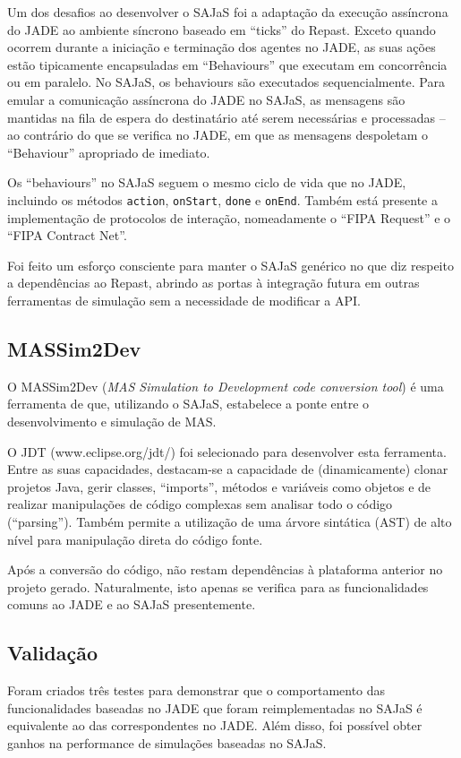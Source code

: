 \documentclass[9pt,a4paper]{extarticle}
\begin{document}
\begin{multicols}{2}
Um dos desafios ao desenvolver o SAJaS foi a adaptação da execução assíncrona do JADE ao ambiente síncrono baseado em ``ticks'' do Repast. Exceto quando ocorrem durante a iniciação e terminação dos agentes no JADE, as suas ações estão tipicamente encapsuladas em ``Behaviours'' que executam em concorrência ou em paralelo. No SAJaS, os behaviours são executados sequencialmente. Para emular a comunicação assíncrona do JADE no SAJaS, as mensagens são mantidas na fila de espera do destinatário até serem necessárias e processadas -- ao contrário do que se verifica no JADE, em que as mensagens despoletam o ``Behaviour'' apropriado de imediato.

Os ``behaviours'' no SAJaS seguem o mesmo ciclo de vida que no JADE, incluindo os métodos \texttt{action}, \texttt{onStart}, \texttt{done} e \texttt{onEnd}. Também está presente a implementação de protocolos de interação, nomeadamente o ``FIPA Request'' e o ``FIPA Contract Net''.

Foi feito um esforço consciente para manter o SAJaS genérico no que diz respeito a dependências ao Repast, abrindo as portas à integração futura em outras ferramentas de simulação sem a necessidade de modificar a API.

\subsection{MASSim2Dev}

O MASSim2Dev (\emph{MAS Simulation to Development code conversion tool}) é uma ferramenta de que, utilizando o SAJaS, estabelece a ponte entre o desenvolvimento e simulação de MAS.

O JDT (www.eclipse.org/jdt/) foi selecionado para desenvolver esta ferramenta. Entre as suas capacidades, destacam-se a capacidade de (dinamicamente) clonar projetos Java, gerir classes, ``imports'', métodos e variáveis como objetos e de realizar manipulações de código complexas sem analisar todo o código (``parsing''). Também permite a utilização de uma árvore sintática (AST) de alto nível para manipulação direta do código fonte.

Após a conversão do código, não restam dependências à plataforma anterior no projeto gerado. Naturalmente, isto apenas se verifica para as funcionalidades comuns ao JADE e ao SAJaS presentemente.

\subsection{Validação}
Foram criados três testes para demonstrar que o comportamento das funcionalidades baseadas no JADE que foram reimplementadas no SAJaS é equivalente ao das correspondentes no JADE. Além disso, foi possível obter ganhos na performance de simulações baseadas no SAJaS.


\end{multicols}
\end{document}
